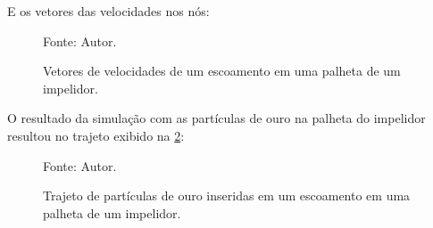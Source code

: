 E os vetores das velocidades nos nós:
\begin{figure}[H]
    \centering
     {\raggedleft \scriptsize Fonte: Autor.}
    \caption{Vetores de velocidades de um escoamento em uma palheta de um impelidor.}
    \label{rotor_velocity}
\end{figure}

O resultado da simulação com as partículas de ouro na palheta do impelidor resultou no trajeto exibido na \ref{rotor_trajectory_gold}:
\begin{figure}[H]
    \centering
     {\raggedleft \scriptsize Fonte: Autor.}
    \caption{Trajeto de partículas de ouro inseridas em um escoamento em uma palheta de um impelidor.}
    \label{rotor_trajectory_gold}
\end{figure}

